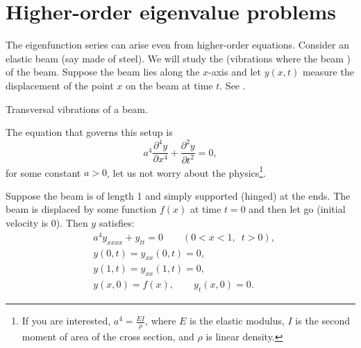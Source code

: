 
\sectionnewpage
\section{Higher-order eigenvalue problems}
\label{sec:appeig}


The eigenfunction series can arise even from higher-order equations.
Consider an elastic beam (say made of steel).  We will study the
\emph{}
(vibrations where the beam )
of the beam.
Suppose the beam lies along
the $x$-axis and let $y(x,t)$ measure the displacement of the point $x$
on the beam at time $t$.  See .

\begin{myfig}
\capstart
{}
\caption{Transversal vibrations of a beam.\label{appeig:transbeamfig}}
\end{myfig}

The equation that governs this setup is
\begin{equation*}
a^4 \frac{\partial^4 y}{\partial x^4} + \frac{\partial^2 y}{\partial t^2} = 0,
\end{equation*}
for some constant $a > 0$, let us not worry about the physics\footnote{If
you are interested, $a^4 = \frac{EI}{\rho}$, where $E$ is the elastic
modulus, $I$ is the second moment of area of the cross section,
and $\rho$ is linear density.}.

Suppose the beam is of length 1 and simply supported (hinged) at the ends.
The beam is displaced by some function $f(x)$ at time $t=0$ and then
let go (initial velocity is 0).  Then $y$ satisfies:
\begin{equation} \label{appeig:beameq}
\begin{aligned}
& a^4 y_{xxxx} + y_{tt} = 0 \qquad (0 < x < 1, \enspace t > 0), \\
& y(0,t) = y_{xx}(0,t) = 0 , \\
& y(1,t) = y_{xx}(1,t) = 0 , \\
& y(x,0) = f(x), \qquad y_{t}(x,0) = 0 .
\end{aligned}
\end{equation}

